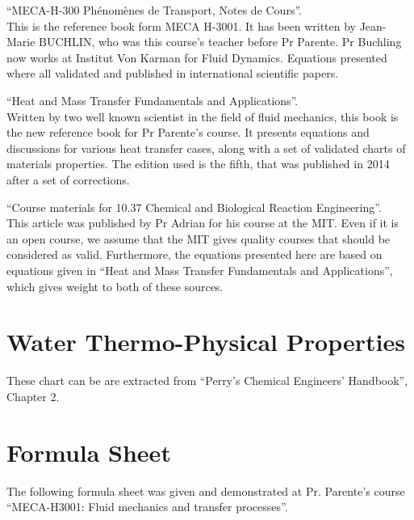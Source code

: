 \documentclass{report}
\begin{document}
	\vspace{11pt}
	
	``MECA-H-300 Phénomènes de Transport, Notes de Cours''\cite{Buchlin}.\\
	This is the reference book form MECA H-3001. It has been written by Jean-Marie BUCHLIN, who was this course's teacher before Pr Parente. Pr Buchling now works at Institut Von Karman for Fluid Dynamics. Equations presented where all validated and published in international scientific papers.
	
	\vspace{11pt}
	
	``Heat and Mass Transfer Fundamentals and Applications''\cite{HaMT}.\\
	Written by two well known scientist in the field of fluid mechanics, this book is the new reference book for Pr Parente's course. It presents equations and discussions for various heat transfer cases, along with a set of validated charts of materials properties. The edition used is the fifth, that was published in 2014 after a set of corrections.
	
	\vspace{11pt}
	
	``Course materials for 10.37 Chemical and Biological Reaction Engineering''\cite{MIT}.\\
	This article was published by Pr Adrian for his course at the MIT. Even if it is an open course, we assume that the MIT gives quality courses that should be considered as valid. Furthermore, the equations presented here are based on equations given in ``Heat and Mass Transfer Fundamentals and Applications''\cite{HaMT}, which gives weight to both of these sources.
	
	
	\chapter{Water Thermo-Physical Properties}\label{WTPP}
	
	These chart can be are extracted from ``Perry’s	Chemical Engineers’ Handbook'', Chapter 2\cite{properties}.
	
	
	
	\chapter{Formula Sheet}\label{FORMU}
	
	The following formula sheet was given and demonstrated at Pr. Parente's course ``MECA-H3001: Fluid mechanics and transfer processes''.
	
\end{document}
